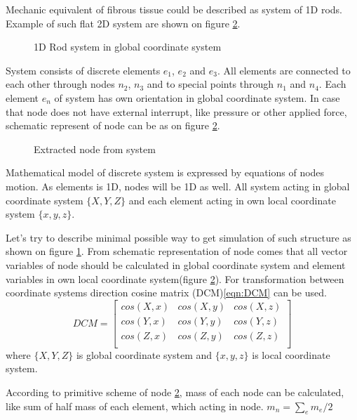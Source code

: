 Mechanic equivalent of fibrous tissue could be described as system of 1D rods.
Example of such flat 2D system are shown on figure \ref{fig:nodeExtract}.
\begin{figure}[H]
  \centering
      
  \caption{1D Rod system in global coordinate system}\label{fig:rodSystem}      
\end{figure} 
System consists of discrete elements $e_1$, $e_2$ and $e_3$. All elements are
connected to each other through nodes $n_2$, $n_3$ and to special points through
$n_1$ and $n_4$. Each element $e_n$ of system has own orientation in global
coordinate system. 
In case that node does not have external interrupt, like pressure or other
 applied force, schematic represent of node can be as on figure
 \ref{fig:nodeExtract}.\par
\begin{figure}[H]
  \centering
      
  \caption{Extracted node from system}\label{fig:nodeExtract}
\end{figure}
Mathematical model of discrete system is expressed by equations of nodes motion.
As elements is 1D, nodes will be 1D as well. All system acting in global
coordinate system $\{X, Y, Z\}$ and each element acting in own local coordinate
system $\{x,y,z\}$.
\par
Let's try to describe minimal possible way to get simulation of such structure
 as shown on figure \ref{fig:rodSystem}. From schematic representation of node
 comes that all vector variables of node should be calculated in global
 coordinate system and element variables in own local coordinate system(figure
 \ref{fig:nodeExtract}). For transformation between coordinate systems direction
 cosine matrix (DCM)\eqref{eqn:DCM} can be used.
\begin{equation}\label{eqn:DCM}
  DCM= \begin{bmatrix}
    cos(X,x)&cos(X,y)&cos(X,z)\\
    cos(Y,x)&cos(Y,y)&cos(Y,z)\\
    cos(Z,x)&cos(Z,y)&cos(Z,z)\\
   \end{bmatrix} 
\end{equation}
where $\{X, Y, Z\}$ is global coordinate system and $\{x,y,z\}$ is local coordinate
system.\par According to primitive scheme of node \ref{fig:nodeExtract}, mass of
each node can be calculated, like sum of half mass of each element, which acting
in node. $m_n=\sum_{e}m_e/2$\par